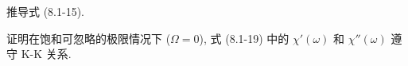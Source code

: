 \documentclass{note}
\begin{document}
\begin{exe}
    推导式 (8.1-15).
\end{exe}
\begin{pf}
    
\end{pf}

\begin{exe}
    证明在饱和可忽略的极限情况下 ($\Omega=0$), 式 (8.1-19) 中的 $\chi'(\omega)$ 和 $\chi''(\omega)$ 遵守 K-K 关系.
\end{exe}
\begin{pf}
    
\end{pf}
\ifx\allfiles\undefined
\end{document}
